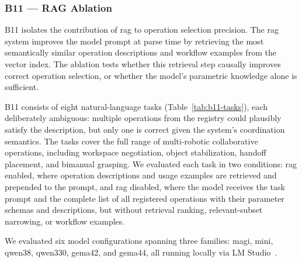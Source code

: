 \documentclass[
     12pt,
     a4paper,
     BCOR=10mm,
     DIV=14,
     listof=totoc,
     bibliography=totoc,
     parskip,
     twoside,
     headsepline
     ]{scrreprt}
\begin{document}
\subsubsection{B11 --- RAG Ablation}\label{sec:results-rag}
B11 isolates the contribution of \gls{rag} to operation selection precision. The \gls{rag} system improves the model prompt at parse time by retrieving the most semantically similar operation descriptions and workflow examples from the vector index. The ablation tests whether this retrieval step causally improves correct operation selection, or whether the model's parametric knowledge alone is sufficient.

B11 consists of eight natural-language tasks (Table~\ref{tab:b11-tasks}), each deliberately ambiguous: multiple operations from the registry could plausibly satisfy the description, but only one is correct given the system's coordination semantics. The tasks cover the full range of multi-robotic collaborative operations, including workspace negotiation, object stabilization, handoff placement, and bimanual grasping. We evaluated each task in two conditions: \gls{rag} enabled, where operation descriptions and usage examples are retrieved and prepended to the prompt, and \gls{rag} disabled, where the model receives the task prompt and the complete list of all registered operations with their parameter schemas and descriptions, but without retrieval ranking, relevant-subset narrowing, or workflow examples.

We evaluated six model configurations spanning three families: \gls{magi}, \gls{mini}, \gls{qwen38}, \gls{qwen330}, \gls{gema42}, and \gls{gema44}, all running locally via LM Studio~\cite{lmstudio}.
\end{document}
